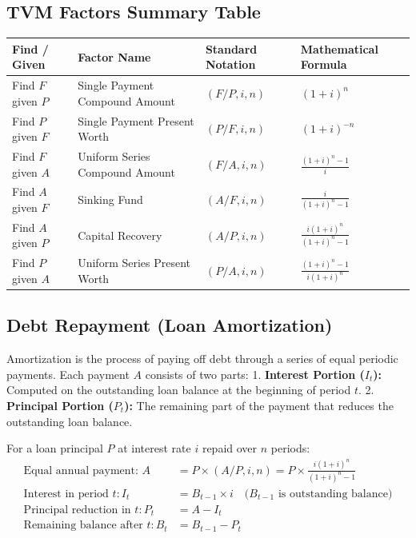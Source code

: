 \documentclass[12pt,a4paper]{article}
\renewcommand{\arraystretch}{1.45}
\begin{document}
\subsection{TVM Factors Summary Table}
\par\noindent
{\renewcommand{\arraystretch}{1.9}%
\begin{tabularx}{\linewidth}{|B{3.2cm}|Y|Y|Y|}
\hline
\textbf{Find / Given} & \textbf{Factor Name} & \textbf{Standard Notation} & \textbf{Mathematical Formula} \\
\hline
Find $F$ given $P$ & Single Payment Compound Amount & $(F/P, i, n)$ & $(1+i)^n$ \\
\hline
Find $P$ given $F$ & Single Payment Present Worth & $(P/F, i, n)$ & $(1+i)^{-n}$ \\
\hline
Find $F$ given $A$ & Uniform Series Compound Amount & $(F/A, i, n)$ & $\displaystyle\frac{(1+i)^n - 1}{i}$ \\[6pt]
\hline
Find $A$ given $F$ & Sinking Fund & $(A/F, i, n)$ & $\displaystyle\frac{i}{(1+i)^n - 1}$ \\[6pt]
\hline
Find $A$ given $P$ & Capital Recovery & $(A/P, i, n)$ & $\displaystyle\frac{i(1+i)^n}{(1+i)^n - 1}$ \\[6pt]
\hline
Find $P$ given $A$ & Uniform Series Present Worth & $(P/A, i, n)$ & $\displaystyle\frac{(1+i)^n - 1}{i(1+i)^n}$ \\[6pt]
\hline
\end{tabularx}}


\subsection{Debt Repayment (Loan Amortization)}
Amortization is the process of paying off debt through a series of equal periodic payments.
Each payment $A$ consists of two parts:
1.  \textbf{Interest Portion ($I_t$):} Computed on the outstanding loan balance at the beginning of period $t$.
2.  \textbf{Principal Portion ($P_t$):} The remaining part of the payment that reduces the outstanding loan balance.

\begin{tcolorbox}[formulabox, title={\textbf{Loan Amortization Equations}}]
For a loan principal $P$ at interest rate $i$ repaid over $n$ periods:
\begin{align}
  \text{Equal annual payment: } A &= P \times (A/P, i, n) = P \times \frac{i(1+i)^n}{(1+i)^n - 1} \\[6pt]
  \text{Interest in period } t: I_t &= B_{t-1} \times i \quad \text{($B_{t-1}$ is outstanding balance)} \\[4pt]
  \text{Principal reduction in } t: P_t &= A - I_t \\[4pt]
  \text{Remaining balance after } t: B_t &= B_{t-1} - P_t
\end{align}
\end{tcolorbox}
\end{document}
